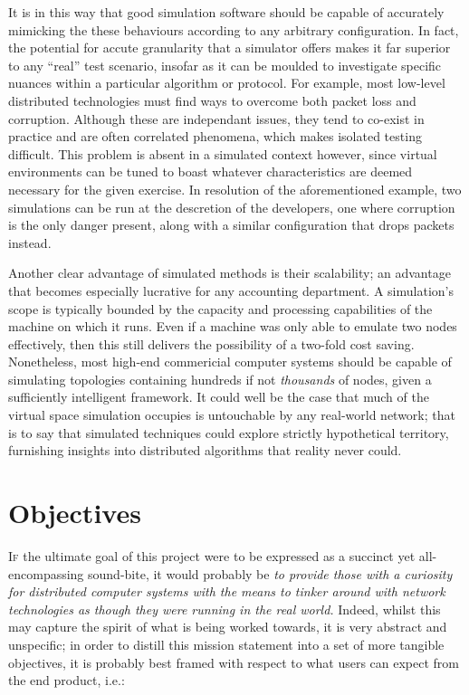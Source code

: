 It is in this way that good simulation software should be capable of accurately mimicking the these behaviours
according to any arbitrary configuration. In fact, the potential for accute granularity that a simulator offers makes
it far superior to any ``real'' test scenario, insofar as it can be moulded to investigate specific nuances within a
particular algorithm or protocol. For example, most low-level distributed technologies must find ways to overcome
both packet loss and corruption. Although these are independant issues, they tend to co-exist in practice and are
often correlated phenomena, which makes isolated testing difficult. This problem is absent in a simulated context
however, since virtual environments can be tuned to boast whatever characteristics are deemed necessary for
the given exercise. In resolution of the aforementioned example, two simulations can be run at the descretion of the
developers, one where corruption is the only danger present, along with a similar configuration that drops packets
instead.

Another clear advantage of simulated methods is their scalability; an advantage that becomes especially lucrative for
any accounting department. A simulation's scope is typically bounded by the capacity and processing capabilities of
the machine on which it runs. Even if a machine was only able to emulate two nodes effectively, then this still
delivers the possibility of a two-fold cost saving. Nonetheless, most high-end commericial computer systems should be
capable of simulating topologies containing hundreds if not \emph{thousands} of nodes, given a sufficiently
intelligent framework. It could well be the case that much of the virtual space simulation occupies is untouchable by
any real-world network; that is to say that simulated techniques could explore strictly hypothetical territory,
furnishing insights into distributed algorithms that reality never could.


\section{Objectives}\label{section:objectives}

\lettrine{I}{f} the ultimate goal of this project were to be expressed as a succinct yet all-encompassing sound-bite,
it would probably be \emph{to provide those with a curiosity for distributed computer systems with the means to tinker
around with network technologies as though they were running in the real world.} Indeed, whilst this may capture the
spirit of what is being worked towards, it is very abstract and unspecific; in order to distill this
mission statement into a set of more tangible objectives, it is probably best framed with respect to what users can
expect from the end product, i.e.:

